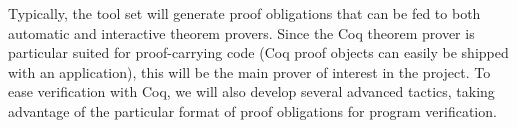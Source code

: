Typically, the tool set will generate proof obligations that can be
fed to both automatic and interactive theorem provers. Since the Coq
theorem prover is particular suited for proof-carrying code (Coq proof
objects can easily be shipped with an application), this will be the
main prover of interest in the \mobius project. To ease verification
with Coq, we will also develop several advanced tactics, taking
advantage of the particular format of proof obligations for program
verification.
 


